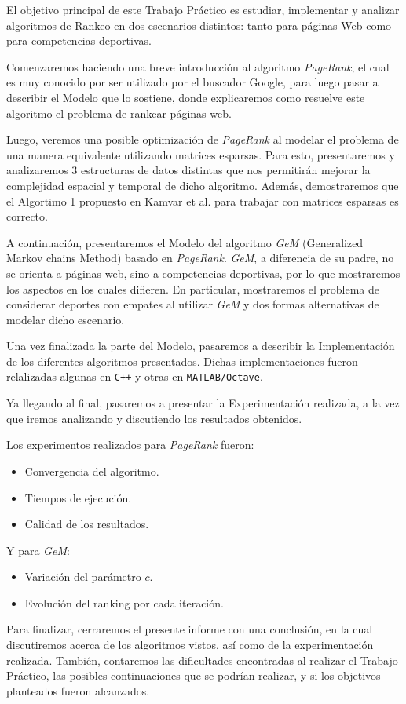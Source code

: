  El objetivo principal de este Trabajo Práctico es estudiar, implementar y analizar
 algoritmos de Rankeo en dos escenarios distintos: tanto para páginas Web como para
 competencias deportivas.

Comenzaremos haciendo una breve introducción al algoritmo \textit{PageRank}, el cual
es muy conocido por ser utilizado por el buscador Google,
 para luego pasar a describir el Modelo que lo sostiene,
donde explicaremos como resuelve este algoritmo el problema de rankear
páginas web.

Luego, veremos una posible optimización de \textit{PageRank} al modelar
el problema de una manera equivalente utilizando matrices esparsas. Para esto,
presentaremos y analizaremos 3 estructuras de datos distintas que nos permitirán mejorar la
complejidad espacial y temporal de dicho algoritmo. Además, demostraremos que el Algortimo 1 propuesto en Kamvar et al.\cite{Kamvar2003}
para trabajar con matrices esparsas es correcto.

A continuación, presentaremos el Modelo del algoritmo \textit{GeM} (Generalized Markov chains Method) basado en
\textit{PageRank}. \textit{GeM}, a diferencia de su padre, no se orienta a páginas web, sino a competencias
deportivas, por lo que mostraremos los aspectos en los cuales difieren.
En particular, mostraremos el problema de considerar deportes con empates al utilizar \textit{GeM} y dos formas
alternativas de modelar dicho escenario.

Una vez finalizada la parte del Modelo, pasaremos a describir la Implementación de los
diferentes algoritmos presentados. Dichas implementaciones fueron relalizadas algunas en
\texttt{C++} y otras en \texttt{MATLAB/Octave}.

Ya llegando al final, pasaremos a presentar la Experimentación realizada, a la vez
que iremos analizando y discutiendo los resultados obtenidos.

Los experimentos realizados para \textit{PageRank} fueron:
\begin{itemize}
    \item Convergencia del algoritmo.
    \item Tiempos de ejecución.
    \item Calidad de los resultados.
\end{itemize}

Y para \textit{GeM}:
\begin{itemize}
    \item Variación del parámetro $c$.
    \item Evolución del ranking por cada iteración.
\end{itemize}

Para finalizar, cerraremos el presente informe con una conclusión, en la cual
discutiremos acerca de los algoritmos vistos, así como de la experimentación realizada.
También, contaremos las dificultades encontradas al realizar el Trabajo Práctico,
las posibles continuaciones que se podrían realizar, y si los objetivos planteados
fueron alcanzados.
